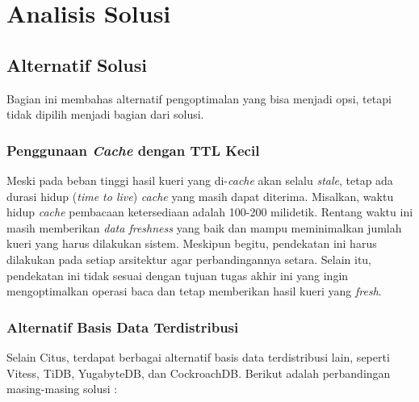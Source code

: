 \chapter{Analisis Solusi}

\section{Alternatif Solusi}

Bagian ini membahas alternatif pengoptimalan yang bisa menjadi opsi, tetapi tidak dipilih menjadi bagian dari solusi.

\subsection{Penggunaan \textit{Cache} dengan TTL Kecil}

Meski pada beban tinggi hasil kueri yang di-\textit{cache} akan selalu \textit{stale}, tetap ada durasi hidup (\textit{time to live}) \textit{cache} yang masih dapat diterima. Misalkan, waktu hidup \textit{cache} pembacaan ketersediaan adalah 100-200 milidetik. Rentang waktu ini masih memberikan \textit{data freshness} yang baik dan mampu meminimalkan jumlah kueri yang harus dilakukan sistem. Meskipun begitu, pendekatan ini harus dilakukan pada setiap arsitektur agar perbandingannya setara. Selain itu, pendekatan ini tidak sesuai dengan tujuan tugas akhir ini yang ingin mengoptimalkan operasi baca dan tetap memberikan hasil kueri yang \textit{fresh}.

\subsection{Alternatif Basis Data Terdistribusi}

Selain Citus, terdapat berbagai alternatif basis data terdistribusi lain, seperti Vitess, TiDB, YugabyteDB, dan CockroachDB. Berikut adalah perbandingan masing-masing solusi \parencite{citus,vitess,tiDB,yugabyte,cockroachDB}:

